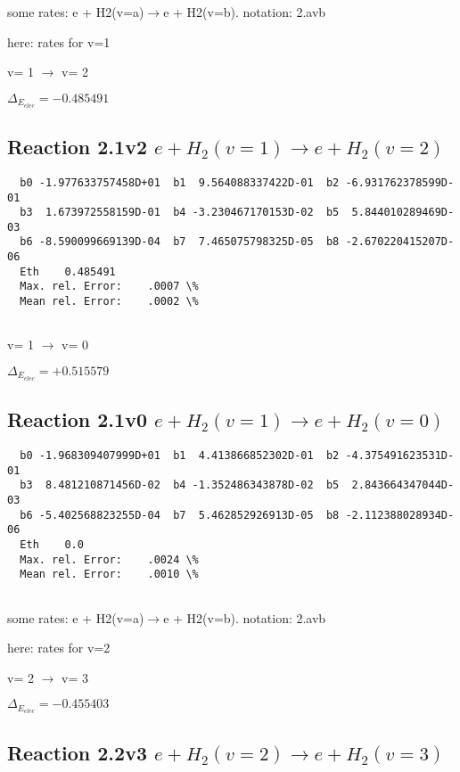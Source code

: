 \documentclass[12pt,dvipdfmx]{article}
\begin{document}
\newpage
some rates: e + H2(v=a)$\rightarrow$e + H2(v=b). notation: 2.avb

here: rates for v=1

  v=  1 $\rightarrow$ v= 2

$\Delta_{E_{elec}}=-0.485491$

\subsection{
Reaction 2.1v2
$ e + H_2(v=1) \rightarrow e + H_2(v=2) $
}

\begin{small}\begin{verbatim}
  b0 -1.977633757458D+01  b1  9.564088337422D-01  b2 -6.931762378599D-01
  b3  1.673972558159D-01  b4 -3.230467170153D-02  b5  5.844010289469D-03
  b6 -8.590099669139D-04  b7  7.465075798325D-05  b8 -2.670220415207D-06
  Eth    0.485491
  Max. rel. Error:    .0007 \%
  Mean rel. Error:    .0002 \%


\end{verbatim}\end{small}

  v=  1 $\rightarrow$ v= 0

$\Delta_{E_{elec}}=+0.515579$

\subsection{
Reaction 2.1v0
$ e + H_2(v=1) \rightarrow e + H_2(v=0) $
}

\begin{small}\begin{verbatim}
  b0 -1.968309407999D+01  b1  4.413866852302D-01  b2 -4.375491623531D-01
  b3  8.481210871456D-02  b4 -1.352486343878D-02  b5  2.843664347044D-03
  b6 -5.402568823255D-04  b7  5.462852926913D-05  b8 -2.112388028934D-06
  Eth    0.0
  Max. rel. Error:    .0024 \%
  Mean rel. Error:    .0010 \%


\end{verbatim}\end{small}
\newpage
some rates: e + H2(v=a)$\rightarrow$e + H2(v=b). notation: 2.avb

here: rates for v=2

  v=  2 $\rightarrow$ v= 3

$\Delta_{E_{elec}}=-0.455403$

\subsection{
Reaction 2.2v3
$ e + H_2(v=2) \rightarrow e + H_2(v=3) $
}
\end{document}
